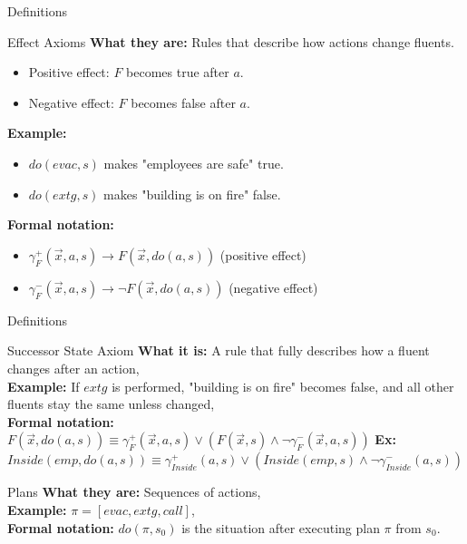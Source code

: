 \documentclass[compress,xcolor=table]{beamer}
\begin{document}
\begin{frame}{Definitions}
    \begin{block}{ Effect Axioms}
        \textbf{What they are:} Rules that describe how actions change fluents.\\
        \begin{itemize}
            \item Positive effect: $F$ becomes true after $a$.
            \item Negative effect: $F$ becomes false after $a$.
        \end{itemize}

        \textbf{Example:}\\
        \begin{itemize}
            \item $do(evac,s)$ makes "employees are safe" true.
            \item $do(extg,s)$ makes "building is on fire" false.
        \end{itemize}
        
        \textbf{Formal notation:}\\
        \begin{itemize}
            \item $\gamma_F^+(\vec{x}, a, s) \rightarrow F(\vec{x}, do(a, s))$ (positive effect)
            \item $\gamma_F^-(\vec{x}, a, s) \rightarrow \neg F(\vec{x}, do(a, s))$ (negative effect)
        \end{itemize}
    \end{block}
\end{frame}

\begin{frame}{Definitions}
    \begin{block}{ Successor State Axiom}
        \textbf{What it is:} A rule that fully describes how a fluent changes after an action,\\
        \textbf{Example:} If $extg$ is performed, "building is on fire" becomes false, and all other fluents stay the same unless changed,\\
        \textbf{Formal notation:}
$F(\vec{x}, do(a, s)) \equiv \gamma_F^+(\vec{x}, a, s) \vee (F(\vec{x}, s) \wedge \neg \gamma_F^-(\vec{x}, a, s))$
        \textbf{Ex:} $Inside(emp,do(a,s)) \equiv \gamma_{Inside}^+(a,s) \vee (Inside(emp,s) \wedge \neg \gamma_{Inside}^-(a,s))$
\end{block}
    \pause
    \begin{block}{Plans}
        \textbf{What they are:} Sequences of actions,\\
        \textbf{Example:} $\pi = [evac, extg, call]$, \\
        \textbf{Formal notation:} $do(\pi, s_0)$ is the situation after executing plan $\pi$ from $s_0$.
    \end{block}
\end{frame}
\end{document}
